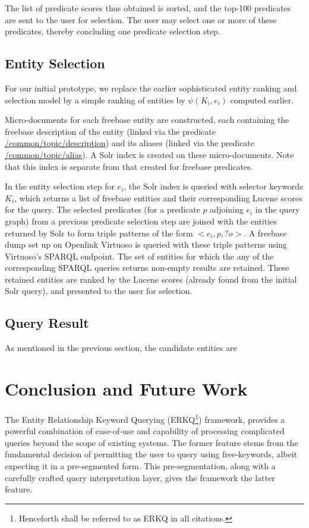 \documentclass[a4paper, twoside, 12pt]{report}
\begin{document}
The list of predicate scores thus obtained is sorted, and the top-100 predicates are sent to the user for selection. The user may select one or more of these predicates, thereby concluding one predicate selection step.	

\section{Entity Selection}

For our initial prototype, we replace the earlier sophisticated entity ranking and selection model by a simple ranking of entities by $\psi(K_i,e_i)$ computed earlier.

Micro-documents for each freebase entity are constructed, each containing the freebase description of the entity (linked via the predicate \url{/common/topic/description}) and its aliases (linked via the predicate \url{/common/topic/alias}). A Solr index is created on these micro-documents. Note that this index is separate from that created for freebase predicates. 

In the entity selection step for $e_i$, the Solr index is queried with selector keywords $K_i$, which returns a list of freebase entities and their corresponding Lucene scores for the query. The selected predicates (for a predicate $p$ adjoining $e_i$ in the query graph) from a previous predicate selection step are joined with the entities returned by Solr to form triple patterns of the form $<e_i, p, ?o>$. A freebase dump set up on Openlink Virtuoso is queried with these triple patterns using Virtuoso's SPARQL endpoint. The set of entities for which the any of the corresponding SPARQL queries returns non-empty results are retained. These retained entities are ranked by the Lucene scores (already found from the initial Solr query), and presented to the user for selection.

\section{Query Result}
As mentioned in the previous section, the candidate entities are 

\chapter{Conclusion and Future Work}

The Entity Relationship Keyword Querying (ERKQ\footnote{Henceforth shall be referred to as ERKQ in all citations.}) framework, provides a powerful combination of ease-of-use and capability of processing complicated queries beyond the scope of existing systems. The former feature stems from the fundamental decision of permitting the user to query using free-keywords, albeit expecting it in a pre-segmented form. This pre-segmentation, along with a carefully crafted query interpretation layer, gives the framework the latter feature.
\end{document}
